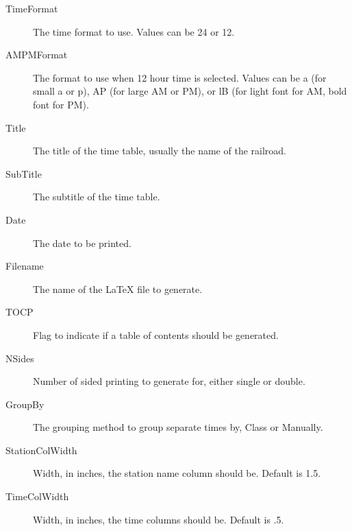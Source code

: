 \begin{description}

\item[TimeFormat] The time format to use.  Values can be 24 or 12.

\item[AMPMFormat] The format to use when 12 hour time is selected. 
Values can be a (for small a or p), AP (for large AM or PM), or lB (for
light font for AM, bold font for PM).

\item[Title] The title of the time table, usually the name of the
railroad.

\item[SubTitle] The subtitle of the time table.

\item[Date] The date to be printed.

\item[Filename] The name of the LaTeX file to generate.

\item[TOCP] Flag to indicate if a table of contents should be generated.

\item[NSides] Number of sided printing to generate for, either single or
double. 

\item[GroupBy] The grouping method to group separate times by, Class or
Manually.

\item[StationColWidth] Width, in inches, the station name column should
be.  Default is 1.5.

\item[TimeColWidth] Width, in inches, the time columns should be.
Default is .5.

\end{description}


